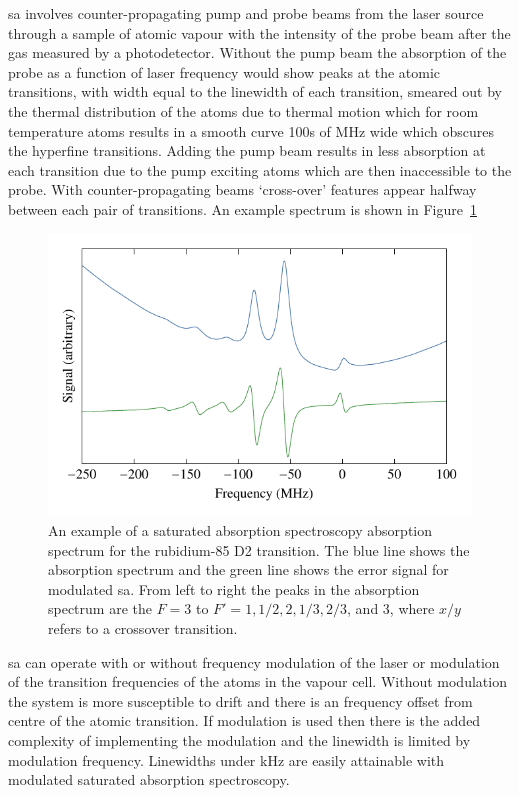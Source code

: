 \Gls{sa} involves counter-propagating pump and probe beams from the laser source through a sample of atomic vapour with the intensity of the probe beam after the gas measured by a photodetector.
Without the pump beam the absorption of the probe as a function of laser frequency would show peaks at the atomic transitions, with width equal to the linewidth of each transition, smeared out by the thermal distribution of the atoms due to thermal motion which for room temperature atoms results in a smooth curve 100s of MHz wide which obscures the hyperfine transitions.
Adding the pump beam results in less absorption at each transition due to the pump exciting atoms which are then inaccessible to the probe. With counter-propagating beams `cross-over' features appear halfway between each pair of transitions.
An example spectrum is shown in Figure~\ref{figure:satabsspectrum}

\begin{figure}
    \center
    \includegraphics{part1/Figs/SatAbsSpectrum.pdf}
    \caption{An example of a saturated absorption spectroscopy absorption spectrum for the rubidium-85 D2 transition.
    The blue line shows the absorption spectrum and the green line shows the error signal for modulated \gls{sa}.
    From left to right the peaks in the absorption spectrum are the $F=3$ to $F'=1,1/2,2,1/3,2/3$, and $3$, where $x/y$ refers to a crossover transition.}
    \label{figure:satabsspectrum}
\end{figure}

\Gls{sa} can operate with or without frequency modulation of the laser or modulation of the transition frequencies of the atoms in the vapour cell.
Without modulation the system is more susceptible to drift and there is an frequency offset from centre of the atomic transition.
If modulation is used then there is the added complexity of implementing the modulation and the linewidth is limited by modulation frequency.
Linewidths under \unit[150]{kHz} are easily attainable with modulated saturated absorption spectroscopy.

